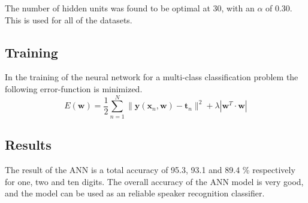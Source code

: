 The number of hidden units was found to be optimal at 30, with an $ \alpha $ of 0.30. This is used for all of the datasets.



\subsection*{Training}
In the training of the neural network for a multi-class classification problem the following error-function is minimized.
\begin{equation}
E(\mathbf{w}) = \dfrac{1}{2} \sum_{n=1}^{N}\| \mathbf{y}(\mathbf{x}_n,\mathbf{w})-\mathbf{t}_n \|^2+\lambda| \mathbf{w}^T \cdot \mathbf{w}|
\label{eq:ANN_error_rap}
\end{equation}



\subsection*{Results}
The result of the ANN is a total accuracy of 95.3, 93.1 and 89.4 \% respectively for one, two and ten digits. 
The overall accuracy of the ANN model is very good, and the model can be used as an reliable speaker recognition classifier.  
